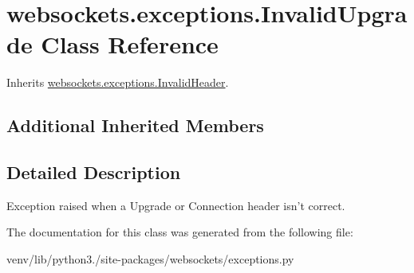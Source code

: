 \hypertarget{classwebsockets_1_1exceptions_1_1_invalid_upgrade}{}\section{websockets.\+exceptions.\+Invalid\+Upgrade Class Reference}
\label{classwebsockets_1_1exceptions_1_1_invalid_upgrade}


Inherits \hyperlink{classwebsockets_1_1exceptions_1_1_invalid_header}{websockets.\+exceptions.\+Invalid\+Header}.

\subsection*{Additional Inherited Members}


\subsection{Detailed Description}
\begin{DoxyVerb}Exception raised when a Upgrade or Connection header isn't correct.\end{DoxyVerb}
 

The documentation for this class was generated from the following file\+:\begin{DoxyCompactItemize}
\item 
venv/lib/python3./site-\/packages/websockets/exceptions.\+py\end{DoxyCompactItemize}
